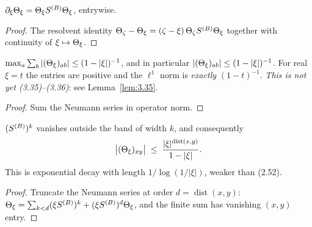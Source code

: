 \begin{lemma}[Equation (2.51)]\label{lem:Theta-deriv}
  \leanok
  $\partial_\xi \Theta_\xi = \Theta_\xi S^{(B)} \Theta_\xi$, entrywise.
\end{lemma}
\begin{proof}\leanok{}
  The resolvent identity
  $\Theta_\zeta-\Theta_\xi=(\zeta-\xi)\,\Theta_\zeta S^{(B)}\Theta_\xi$
  together with continuity of $\xi\mapsto\Theta_\xi$.
\end{proof}

\begin{lemma}\label{lem:Theta-bounds}
  \leanok
  $\max_a\sum_b |(\Theta_\xi)_{ab}| \le (1-|\xi|)^{-1}$, and in particular
  $|(\Theta_\xi)_{ab}| \le (1-|\xi|)^{-1}$.  For real $\xi = t$ the entries are positive and
  the $\ell^1$ norm is \emph{exactly} $(1-t)^{-1}$.
  \emph{This is not yet (3.35)--(3.36)}: see Lemma~\ref{lem:3.35}.
\end{lemma}
\begin{proof}\leanok{}
  Sum the Neumann series in operator norm.
\end{proof}

\begin{lemma}\label{lem:Theta-band}
  \leanok
  $(S^{(B)})^k$ vanishes outside the band of width $k$, and consequently
  \[ \bigl|(\Theta_\xi)_{xy}\bigr| \;\le\;
     \frac{|\xi|^{\operatorname{dist}(x,y)}}{1-|\xi|} . \]
  This is exponential decay with length $1/\log(1/|\xi|)$, weaker than (2.52).
\end{lemma}
\begin{proof}\leanok{}
  Truncate the Neumann series at order $d=\operatorname{dist}(x,y)$:
  $\Theta_\xi=\sum_{k<d}(\xi S^{(B)})^k+(\xi S^{(B)})^d\Theta_\xi$, and the finite sum has
  vanishing $(x,y)$ entry.
\end{proof}

